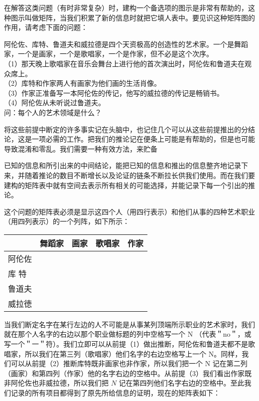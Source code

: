 在解答这类问题（有时非常复杂）时，建构一个备选项的图示是非常有帮助的，这种图示叫做矩阵，当我们积累了新的信息时就把它填人表中。要见识这种矩阵图的作用，请考虑下面的问题：

阿伦佐、库特、鲁道夫和威拉德是四个天资极高的创造性的艺术家。一个是舞蹈家，一个是画家，一个是歌唱家，一个是作家，但不必是这个次序。\\
（1）那天晚上歌唱家在音乐会舞台上进行他的首次演出时，阿伦佐和鲁道夫在观众席上。\\
（2）库特和作家两人有画家为他们画的生活肖像。\\
（3）作家正准备写一本阿伦佐的传记，他写的威拉德的传记是畅销书。\\
（4）阿伦佐从未听说过鲁道夫。\\
问：每个人的艺术领域是什么？

将这些前提中断定的许多事实记在头脑中，也记住几个可以从这些前提推出的分结论，这是一项必需的工作。把我们的推论记在便条上可能是有帮助的，但是也可能导致混淆和零乱。我们需要一种有效方法，来贮备

已知的信息和所引出来的中间结论，能把已知的信息和推出的信息整齐地记录下来，并随着推论的数目不断增长以及论证的链条不断拉长供我们使用。而在我们要建构的矩阵表中就有空间去表示所有相关的可能选择，并能记录下每一个引出的推论。

这个问题的矩阵表必须是显示这四个人（用四行表示）和他们从事的四种艺术职业（用四列表示）的一个列阵，如下所示：

\begin{center}
\begin{tabular}{|l|l|l|l|l|}
\hline
 & 舞蹈家 & 画家 & 歌唱家 & 作家 \\
\hline
阿伦佐 &  &  &  &  \\
\hline
库 特 &  &  &  &  \\
\hline
鲁道夫 &  &  &  &  \\
\hline
威拉徳 &  &  &  &  \\
\hline
\end{tabular}
\end{center}

当我们断定名字在某行左边的人不可能是从事某列顶端所示职业的艺术家时，我们就在那个人名字的右边以那个职业做标题的列中空格写一个 N （代表＂no＂，或写一个＂一＂符）。我们立即可以从前提（1）做出推断，阿伦佐和鲁道夫都不是歌唱家，所以我们在第三列（歌唱家）他们名字的右边空格写上一个 N。同样，我们可以从前提（2）推断库特既非画家也非作家，所以我们把一个 N 记在第二列（画家）和第四列（作家）他的名字右边的空格中。从前提（3）我们看出作家既非阿伦佐也非威拉德，所以我们把 $N$ 记在第四列他们名字右边的空格中。至此我们记录的所有项目都得到了原先所给信息的证明，现在的矩阵表如下：

